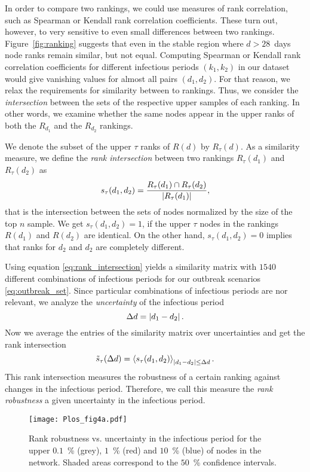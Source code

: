 In order to compare two rankings, we could use measures of rank correlation, such as Spearman or Kendall rank correlation coefficients.
These turn out, however, to very sensitive to even small differences between two rankings.
Figure~\ref{fig:ranking} suggests that even in the stable region where $d>28$~days node ranks remain similar, but not equal.
Computing Spearman or Kendall rank correlation coefficients for different infectious periods $(k_1,k_2)$ in our dataset would give vanishing values for almost all pairs $(d_1,d_2)$.
For that reason, we relax the requirements for similarity between to rankings.
Thus, we consider the \emph{intersection} between the sets of the respective upper samples of each ranking.
In other words, we examine whether the same nodes appear in the upper ranks of both the $R_{d_1}$ and the $R_{d_2}$ rankings.

We denote the subset of the upper $\tau $ ranks of $R(d)$ by $R_\tau (d)$.
As a similarity measure, we define the \emph{rank intersection} between two rankings $R_\tau (d_1)$ and $R_\tau (d_2)$ as
\begin{equation}\label{eq:rank_intersection}
s_\tau (d_1,d_2)=\frac{R_\tau (d_1) \cap R_\tau (d_2)}{\left| R_\tau (d_1) \right|},
\end{equation}
that is the intersection between the sets of nodes normalized by the size of the top $n$ sample.
We get $s_\tau (d_1,d_2) =1$, if the upper $\tau $ nodes in the rankings $R(d_1)$ and $R(d_2)$ are identical.
On the other hand, $s_\tau (d_1,d_2) =0$ implies that ranks for $d_2$ and $d_2$ are completely different.

Using equation \eqref{eq:rank_intersection} yields a similarity matrix with $1540$ different combinations of infectious periods for our outbreak scenarios \eqref{eq:outbreak_set}.
Since particular combinations of infectious periods are nor relevant, we analyze the \emph{uncertainty} of the infectious period
\begin{equation}\label{eq:uncertainty_k}
\Delta d= \left| d_1-d_2 \right| .
\end{equation}
Now we average the entries of the similarity matrix over uncertainties and get the rank intersection
\begin{equation}\label{eq:robustness_k}
\tilde{s}_\tau (\Delta d)=\left< s_\tau (d_1,d_2) \right>_{\left| d_1-d_2 \right|\leq \Delta d} .
\end{equation}
This rank intersection measures the robustness of a certain ranking against changes in the infectious period.
Therefore, we call this measure the \emph{rank robustness} a given uncertainty in the infectious period.
%
\begin{SCfigure}
\texttt{[image: Plos\_fig4a.pdf]}
\caption{Rank robustness vs. uncertainty in the infectious period for the upper $0.1$~\% (grey), $1$~\% (red) and $10$~\% (blue) of nodes in the network.
Shaded areas correspond to the $50$~\% confidence intervals.}
\label{fig:plos_fig4a}
\end{SCfigure}

